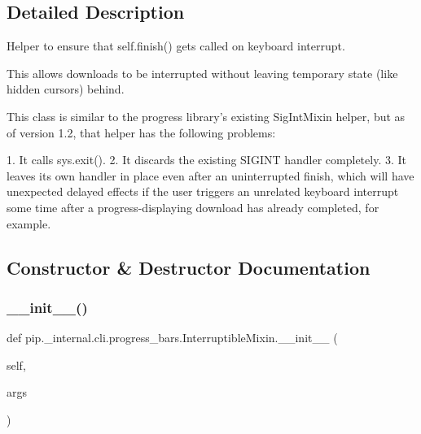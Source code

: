 \subsection{Detailed Description}
\begin{DoxyVerb}Helper to ensure that self.finish() gets called on keyboard interrupt.

This allows downloads to be interrupted without leaving temporary state
(like hidden cursors) behind.

This class is similar to the progress library's existing SigIntMixin
helper, but as of version 1.2, that helper has the following problems:

1. It calls sys.exit().
2. It discards the existing SIGINT handler completely.
3. It leaves its own handler in place even after an uninterrupted finish,
   which will have unexpected delayed effects if the user triggers an
   unrelated keyboard interrupt some time after a progress-displaying
   download has already completed, for example.
\end{DoxyVerb}
 

\subsection{Constructor \& Destructor Documentation}
\mbox{\label{classpip_1_1__internal_1_1cli_1_1progress__bars_1_1InterruptibleMixin_a68e5844e2a3fb4012a74b4f31010564e}} 
\subsubsection{\texorpdfstring{\+\_\+\+\_\+init\+\_\+\+\_\+()}{\_\_init\_\_()}}
{\footnotesize\ttfamily def pip.\+\_\+internal.\+cli.\+progress\+\_\+bars.\+Interruptible\+Mixin.\+\_\+\+\_\+init\+\_\+\+\_\+ (\begin{DoxyParamCaption}\item[{}]{self,  }\item[{}]{args }\end{DoxyParamCaption})}



